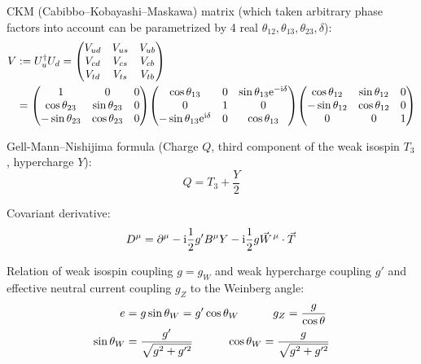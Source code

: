 			\noindent
			CKM (Cabibbo--Kobayashi--Maskawa) matrix (which taken arbitrary phase factors into account can be parametrized by 4 real \dof $\theta_{12}, \theta_{13}, \theta_{23}, \delta$):
			\begin{equation}
				\begin{aligned}
					V &:= U_u^\dagger U_d = \mqty(V_{ud} & V_{us} & V_{ub} \\ V_{cd} & V_{cs} & V_{cb} \\ V_{td} & V_{ts} & V_{tb}) \\
					&= \mqty(
						1 & 0 & 0 \\
						\cos\theta_{23} & \sin\theta_{23} & 0 \\
						-\sin\theta_{23} & \cos\theta_{23} & 0)
					\mqty(
						\cos\theta_{13} & 0 & \sin\theta_{13} \ex^{-\i\delta} \\ 
						0 & 1 & 0 \\ 
						-\sin\theta_{13} \ex^{\i\delta} & 0 & \cos\theta_{13})
					\mqty(
						\cos\theta_{12} & \sin\theta_{12} & 0 \\
						-\sin\theta_{12} & \cos\theta_{12} & 0 \\
						0 & 0 & 1)
				\end{aligned}
			\end{equation}

			\noindent
			Gell-Mann--Nishijima formula (Charge $Q$, third component of the weak isospin $T_3$, hypercharge $Y$):
			\begin{equation}
				\label{Eq:GellMannNishijima}
				Q = T_3 + \frac{Y}{2}
			\end{equation}

			\noindent
			Covariant derivative:
			\begin{equation}
				D^\mu = \partial^\mu - \i \frac{1}{2} g' B^\mu Y - \i \frac{1}{2} g \vec{W}^\mu \cdot \vec{T}
			\end{equation}

			\noindent
			Relation of weak isospin coupling $g=g_W$ and weak hypercharge coupling $g'$ and effective neutral current coupling $g_Z$ to the Weinberg angle:
			\begin{align}
				e &= g \sin\theta_W = g' \cos\theta_W 
				\hspace{30pt} g_Z = \frac{g}{\cos\theta} \\
				\sin \theta_W &= \frac{g'}{\sqrt{g^2 + g'^2}}
				\hspace{30pt} \cos \theta_W = \frac{g}{\sqrt{g^2 + g'^2}}
			\end{align}


